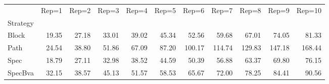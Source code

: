 \begin{tabular}{lrrrrrrrrrr}
\toprule
 & Rep=1 & Rep=2 & Rep=3 & Rep=4 & Rep=5 & Rep=6 & Rep=7 & Rep=8 & Rep=9 & Rep=10 \\
Strategy &  &  &  &  &  &  &  &  &  &  \\
\midrule
Block & 19.35 & 27.18 & 33.01 & 39.02 & 45.34 & 52.56 & 59.68 & 67.01 & 74.05 & 81.33 \\
Path & 24.54 & 38.80 & 51.86 & 67.09 & 87.20 & 100.17 & 114.74 & 129.83 & 147.18 & 168.44 \\
Spec & 18.79 & 27.11 & 32.98 & 38.52 & 44.59 & 50.39 & 56.88 & 63.37 & 69.80 & 76.15 \\
SpecBva & 32.15 & 38.57 & 45.13 & 51.57 & 58.53 & 65.67 & 72.00 & 78.25 & 84.41 & 90.56 \\
\bottomrule
\end{tabular}
